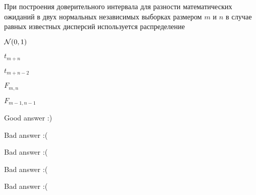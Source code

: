 
\begin{question}
При построения доверительного интервала для разности математических
ожиданий в двух нормальных независимых выборках размером \(m\) и \(n\) в
случае равных известных дисперсий используется распределение
\begin{answerlist}
  \item \(\mathcal{N}(0, 1)\)
  \item \(t_{m+n}\)
  \item \(t_{m+n-2}\)
  \item \(F_{m,n}\)
  \item \(F_{m-1, n-1}\)
\end{answerlist}
\end{question}

\begin{solution}
\begin{answerlist}
  \item Good answer :)
  \item Bad answer :(
  \item Bad answer :(
  \item Bad answer :(
  \item Bad answer :(
\end{answerlist}
\end{solution}

